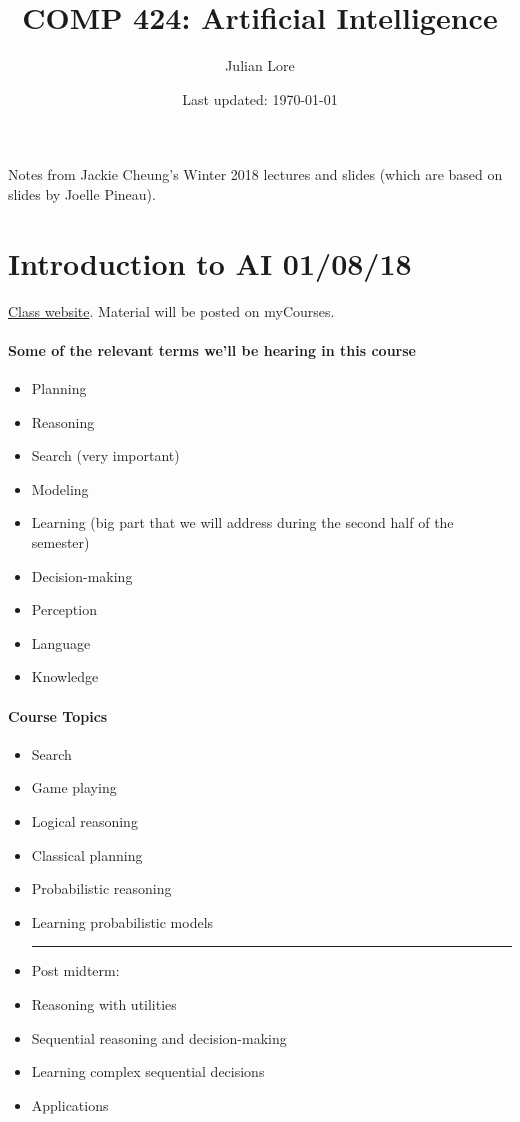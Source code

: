 \documentclass[12 pt]{article}
\author{Julian Lore}
\date{Last updated: \today}
\title{COMP 424: Artificial Intelligence}
\begin{document}
	\onehalfspacing
	\maketitle
	Notes from Jackie Cheung's Winter 2018 lectures and slides
        (which are based on slides by Joelle Pineau).
	\tableofcontents
        \section{Introduction to AI 01/08/18}
        \href{http://cs.mcgill.ca/~jcheung/teaching/winter-2018/comp424/index.html}{Class
          website}. Material will be posted on myCourses.
        \paragraph{Some of the relevant terms we'll be hearing in this
          course}
        \begin{itemize}
        \item Planning
        \item Reasoning
        \item Search (very important)
        \item Modeling
        \item Learning (big part that we will address during the
          second half of the semester)
        \item Decision-making
        \item Perception
        \item Language
        \item Knowledge
        \end{itemize}
        \paragraph{Course Topics}
        \begin{itemize}
        \item Search
        \item Game playing
        \item Logical reasoning
        \item Classical planning
        \item Probabilistic reasoning
        \item Learning probabilistic models
          \\\noindent\rule{\textwidth}{0.5pt}
        \item Post midterm:
        \item Reasoning with utilities
        \item Sequential reasoning and decision-making
        \item Learning complex sequential decisions
        \item Applications
        \end{itemize}
\end{document}
